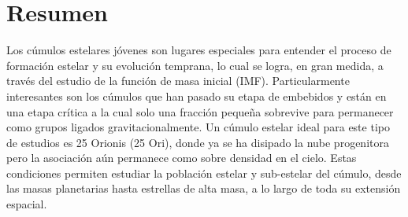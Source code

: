 \documentclass[12pt]{article}
\providecommand\phantomsection{} %
\begin{document}
\newpage
\tableofcontents
\newpage
\newpage
\phantomsection
{}
\listoffigures
\newpage
\phantomsection
{}
\listoftables
\newpage
\phantomsection
{}
\printacronyms[include-classes=abbrev,name=Abbreviations]
\newpage
\phantomsection
{}
\printacronyms[include-classes=nomencl,name=Nomenclature]
\newpage

\phantomsection
\section*{\centering Resumen}
%

Los c\'umulos estelares j\'ovenes son lugares especiales para entender el proceso de formaci\'on estelar y su evoluci\'on temprana, lo cual se logra, en gran medida, a trav\'es del estudio de la funci\'on de masa inicial (IMF). Particularmente interesantes son los c\'umulos que han pasado su etapa de embebidos y est\'an en una etapa cr\'itica a la cual solo una fracci\'on peque\~na sobrevive para permanecer como grupos ligados gravitacionalmente. Un c\'umulo estelar ideal para este tipo de estudios es 25 Orionis (25 Ori), donde ya se ha disipado la nube progenitora pero la asociaci\'on a\'un permanece como sobre densidad en el cielo. Estas condiciones permiten estudiar la poblaci\'on estelar y sub-estelar del c\'umulo, desde las masas planetarias hasta estrellas de alta masa, a lo largo de toda su extensi\'on espacial. 
\end{document}
